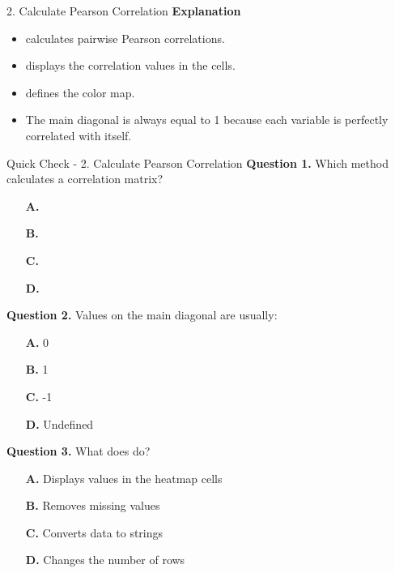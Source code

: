 \documentclass[aspectratio=169,11pt]{beamer}
\begin{document}
\begin{frame}[allowframebreaks]{2. Calculate Pearson Correlation}
\small
\textbf{Explanation}\par\medskip
\begin{itemize}
\item \texttt{} calculates pairwise Pearson correlations.
\item \texttt{} displays the correlation values in the cells.
\item \texttt{} defines the color map.
\item The main diagonal is always equal to 1 because each variable is perfectly correlated with itself.
\end{itemize}
\end{frame}
\begin{frame}[allowframebreaks]{Quick Check - 2. Calculate Pearson Correlation}
\footnotesize
\textbf{Question 1.} Which method calculates a correlation matrix?\par\medskip
\begin{itemize}
\item[\textbf{A.}] \texttt{}
\item[\textbf{B.}] \texttt{}
\item[\textbf{C.}] \texttt{}
\item[\textbf{D.}] \texttt{}
\end{itemize}
\textbf{Question 2.} Values on the main diagonal are usually:\par\medskip
\begin{itemize}
\item[\textbf{A.}] 0
\item[\textbf{B.}] 1
\item[\textbf{C.}] -1
\item[\textbf{D.}] Undefined
\end{itemize}
\textbf{Question 3.} What does \texttt{} do?\par\medskip
\begin{itemize}
\item[\textbf{A.}] Displays values in the heatmap cells
\item[\textbf{B.}] Removes missing values
\item[\textbf{C.}] Converts data to strings
\item[\textbf{D.}] Changes the number of rows
\end{itemize}
\end{frame}
\end{document}
